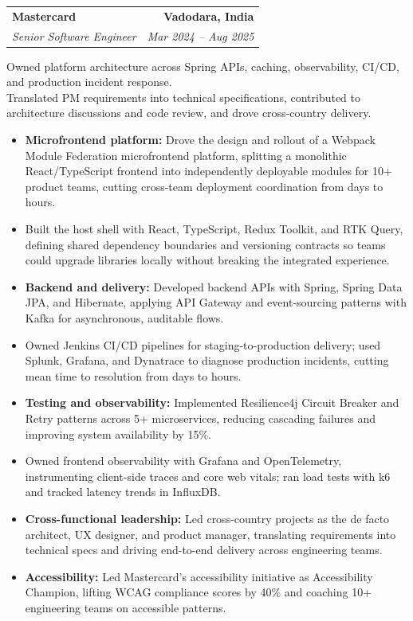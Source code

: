 \documentclass[letterpaper,11pt]{article}
\makeatletter
\newcommand{\resumeItem}[1]{
  \item\small{
    {#1 \vspace{-3pt}}
  }
}
\newcommand{\resumeSubheading}[4]{
  \vspace{-3pt}\item
    \begin{tabular*}{1.0\textwidth}[t]{l@{\extracolsep{\fill}}r}
      \textbf{#1} & \textbf{\small #2} \\
      \textit{\small#3} & \textit{\small #4} \\
    \end{tabular*}\vspace{-2pt}
}
\newcommand{\resumeRoleSummary}[1]{
  {\small #1\par}
  \vspace{-2pt}
}
\newcommand{\resumeItemListStart}{\begin{itemize}}
\newcommand{\resumeItemListEnd}{\end{itemize}\vspace{0pt}}
\makeatother
\begin{document}
    \resumeSubheading
      {Mastercard}{Vadodara, India}
      {Senior Software Engineer}{Mar 2024 -- Aug 2025}
      \resumeRoleSummary{Owned platform architecture across Spring APIs, caching, observability, CI/CD, and production incident response.\\
      Translated PM requirements into technical specifications, contributed to architecture discussions and code review, and drove cross-country delivery.}
      \resumeItemListStart
              \resumeItem{\textbf{Microfrontend platform:} Drove the design and rollout of a Webpack Module Federation microfrontend platform, splitting a monolithic React/TypeScript frontend into independently deployable modules for 10+ product teams, cutting cross-team deployment coordination from days to hours.}
      \resumeItem{Built the host shell with React, TypeScript, Redux Toolkit, and RTK Query, defining shared dependency boundaries and versioning contracts so teams could upgrade libraries locally without breaking the integrated experience.}
      \resumeItem{\textbf{Backend and delivery:} Developed backend APIs with Spring, Spring Data JPA, and Hibernate, applying API Gateway and event-sourcing patterns with Kafka for asynchronous, auditable flows.}
      \resumeItem{Owned Jenkins CI/CD pipelines for staging-to-production delivery; used Splunk, Grafana, and Dynatrace to diagnose production incidents, cutting mean time to resolution from days to hours.}
      \resumeItem{\textbf{Testing and observability:} Implemented Resilience4j Circuit Breaker and Retry patterns across 5+ microservices, reducing cascading failures and improving system availability by 15\%.}
      \resumeItem{Owned frontend observability with Grafana and OpenTelemetry, instrumenting client-side traces and core web vitals; ran load tests with k6 and tracked latency trends in InfluxDB.}
      \resumeItem{\textbf{Cross-functional leadership:} Led cross-country projects as the de facto architect, UX designer, and product manager, translating requirements into technical specs and driving end-to-end delivery across engineering teams.}
      \resumeItem{\textbf{Accessibility:} Led Mastercard's accessibility initiative as Accessibility Champion, lifting WCAG compliance scores by 40\% and coaching 10+ engineering teams on accessible patterns.}
      \resumeItemListEnd
\end{document}
